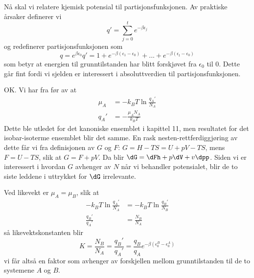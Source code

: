 Nå skal vi relatere kjemisk potensial til partisjonsfunksjonen. Av praktiske årsaker definerer vi
\begin{equation}
	q' = \sum_{j=0}^t e^{-\beta\epsilon_j}
\end{equation}
og redefinerer partisjonsfunksjonen som
\begin{equation}
	q = e^{\beta\epsilon_0}q' = 1 + e^{-\beta(\epsilon_1-\epsilon_0)}+...+e^{-\beta(\epsilon_t-\epsilon_0)}
\end{equation}
som betyr at energien til grunntilstanden har blitt forskjøvet fra $\epsilon_0$ til 0. Dette går fint fordi vi sjelden er interessert i absoluttverdien til partisjonsfunksjonen.

OK. Vi har fra før av at 
\begin{align}
	\mu_A&=-k_BT\ln\frac{q_A'}{N_A}\\
	q_A'&=-\frac{\mu_A N_A}{k_BT}
\end{align}
Dette ble utledet for det kanoniske ensemblet i kapittel 11, men resultatet for det isobar-isoterme ensemblet blir det samme. En rask nesten-rettferdiggjøring av dette får vi fra definisjonen av $G$ og $F$: $G=H-TS=U+pV-TS$, mens $F=U-TS$, slik at $G=F+pV$. Da blir $\dG=\dFh+p\dV+v\dpp$. Siden vi er interessert i hvordan $G$ avhenger av $N$ når vi behandler potensialet, blir de to siste leddene i uttrykket for $\dG$ irrelevante.

Ved likevekt er $\mu_A=\mu_B$, slik at
\begin{align}
	-k_BT\ln\frac{q_A'}{N_A}&=-k_BT\ln\frac{q_B'}{N_B} \\
	\frac{q_B'}{q_A'}&=\frac{N_B}{N_A}
\end{align}
så likevektskonstanten blir
\begin{equation}
	\label{equilibriumconstant}
	K = \frac{N_B}{N_A}=\frac{q_B'}{q_A'}=\frac{q_B}{q_A}e^{-\beta(\epsilon_0^B-\epsilon_0^A)}
\end{equation}
vi får altså en faktor som avhenger av forskjellen mellom grunntilstanden til de to systemene $A$ og $B$.

